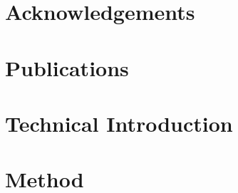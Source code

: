 \documentclass[a4paper]{report}
\begin{document}

\chapter*{Acknowledgements}

\chapter*{Publications}

\begin{abstract}
\end{abstract}

\tableofcontents

\listoffigures

\listoftables
{}







\chapter{Technical Introduction}
\label{ch:techintro}

\chapter{Method}
\label{ch:method}
\end{document}
